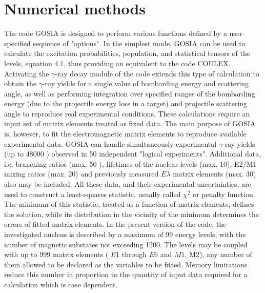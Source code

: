 \documentclass[10pt]{article}
\begin{document}
\section*{Numerical methods}
The code GOSIA is designed to perform various functions defined by a user-specified sequence of "options". In the simplest mode, GOSIA can be used to calculate the excitation probabilities, population, and statistical tensors of the levels, equation 4.1, thus providing an equivalent to the code COULEX. Activating the $\gamma$-ray decay module of the code extends this type of calculation to obtain the $\gamma$-ray yields for a single value of bombarding energy and scattering angle, as well as performing integration over specified ranges of the bombarding energy (due to the projectile energy loss in a target) and projectile scattering angle to reproduce real experimental conditions. These calculations require an input set of matrix elements treated as fixed data. The main purpose of GOSIA is, however, to fit the electromagnetic matrix elements to reproduce available experimental data. GOSIA can handle simultaneously experimental $\gamma$-ray yields (up to 48000 ) observed in 50 independent "logical experiments". Additional data, i.e. branching ratios (max. 50 ), lifetimes of the nuclear levels (max. 10), E2/M1 mixing ratios (max. 20) and previously measured $E \lambda$ matrix elements (max. 30) also may be included. All these data, and their experimental uncertainties, are used to construct a least-squares statistic, usually called $\chi^{2}$ or penalty function. The minimum of this statistic, treated as a function of matrix elements, defines the solution, while its distribution in the vicinity of the minimum determines the errors of fitted matrix elements. In the present version of the code, the investigated nucleus is described by a maximum of 99 energy levels, with the number of magnetic substates not exceeding 1200. The levels may be coupled with up to 999 matrix elements ( $E 1$ through $E 6$ and $M 1$, M2), any number of them allowed to be declared as the variables to be fitted. Memory limitations reduce this number in proportion to the quantity of input data required for a calculation which is case dependent.
\end{document}
